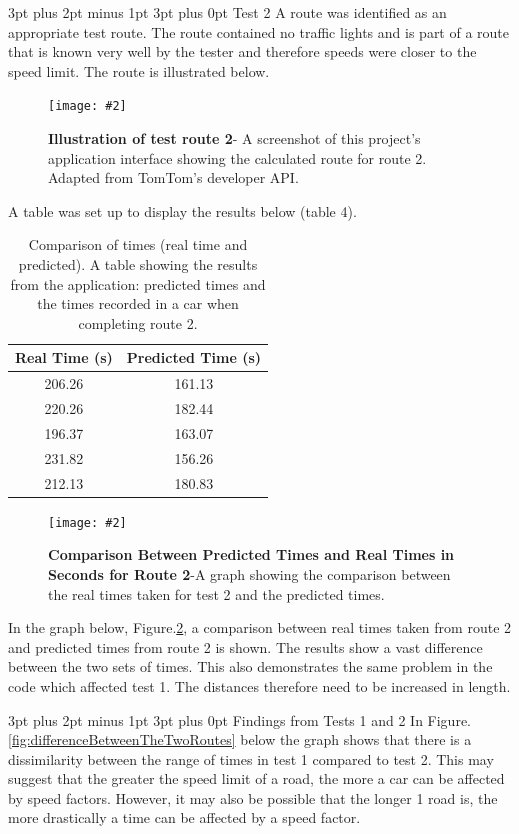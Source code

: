 \documentclass[12pt,a4paper]{article}
\makeatletter
\newcommand{\figuremacro}[5]{
    \begin{figure}[#1]
        \centering
        \texttt{[image: \#2]}
        \caption[#3]{\textbf{#3}#4}
        \label{fig:#2}
    \end{figure}
}
\renewcommand\subsection{\@startsection {subsection}{1}{0mm} %
                               {3pt plus 2pt minus 1pt} %
                               {3pt plus 0pt} %
                               {\normalfont\bfseries}}
\makeatother
\begin{document}
\subsection{Test 2}
A route was identified as an appropriate test route. The route contained no traffic lights and is part of a route that is known very well by the tester and therefore speeds were closer to the speed limit. The route is illustrated below.

\figuremacro{h}{testRoute2}{Illustration of test route 2}{- A screenshot of this project's application interface showing the calculated route for route 2. Adapted from TomTom's developer API\cite{TomTomMapAPI}.}{0.35}

A table was set up to display the results below (table 4).

\begin{table}[ht]
	\centering
	\caption{Comparison of times (real time and predicted). A table showing the results from the application: predicted times and the times recorded in a car when completing route 2.}
	\begin{tabular}{@{}cc@{}}
		\toprule
		Real Time (s) & Predicted Time (s) \\ \midrule
		206.26        & 161.13            \\
		220.26        & 182.44             \\
		196.37        & 163.07             \\
		231.82        & 156.26             \\
		212.13        & 180.83            \\ \bottomrule
	\end{tabular}
\end{table}

\figuremacro{h}{graph2}{Comparison Between Predicted Times and Real Times in Seconds for Route 2}{-A graph showing the comparison between the real times taken for test 2 and the predicted times.}{0.8}

In the graph below, Figure.\ref{fig:graph2}, a comparison between real times taken from route 2 and predicted times from route 2 is shown. The results show a vast difference between the two sets of times. This also demonstrates the same problem in the code which affected test 1. The distances therefore need to be increased in length. 

\newpage

\subsection{Findings from Tests 1 and 2}
In Figure.\ref{fig:differenceBetweenTheTwoRoutes} below the graph shows that there is a dissimilarity between the range of times in test 1 compared to test 2. This may suggest that the greater the speed limit of a road, the more a car can be affected by speed factors. However, it may also be possible that the longer 1 road is, the more drastically a time can be affected by a speed factor. 
\end{document}
